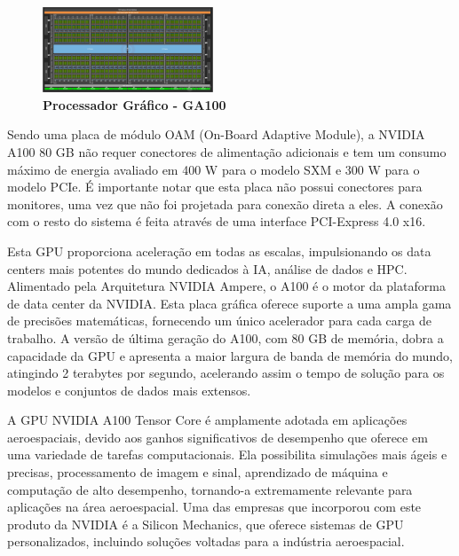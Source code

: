 \documentclass[conference]{IEEEtran}
\begin{document}
\begin{figure}[h]
\centerline{\includegraphics[width = 2.0in]{ga100.jpg}}
\caption{\textbf{Processador Gráfico - GA100}}
\label{figAM9300}
\end{figure}

\par Sendo uma placa de módulo OAM (On-Board Adaptive Module), a NVIDIA A100 80 GB não requer conectores de alimentação adicionais e tem um consumo máximo de energia avaliado em 400 W para o modelo SXM e 300 W para o modelo PCIe. É importante notar que esta placa não possui conectores para monitores, uma vez que não foi projetada para conexão direta a eles. A conexão com o resto do sistema é feita através de uma interface PCI-Express 4.0 x16.

\par Esta GPU proporciona aceleração em todas as escalas, impulsionando os data centers mais potentes do mundo dedicados à IA, análise de dados e HPC.  Alimentado pela Arquitetura NVIDIA Ampere, o A100 é o motor da plataforma de data center da NVIDIA. Esta placa gráfica oferece suporte a uma ampla gama de precisões matemáticas, fornecendo um único acelerador para cada carga de trabalho. A versão de última geração do A100, com 80 GB de memória, dobra a capacidade da GPU e apresenta a maior largura de banda de memória do mundo, atingindo 2 terabytes por segundo, acelerando assim o tempo de solução para os modelos e conjuntos de dados mais extensos.

\par A GPU NVIDIA A100 Tensor Core é amplamente adotada em aplicações aeroespaciais, devido aos ganhos significativos de desempenho que oferece em uma variedade de tarefas computacionais. Ela possibilita simulações mais ágeis e precisas, processamento de imagem e sinal, aprendizado de máquina e computação de alto desempenho, tornando-a extremamente relevante para aplicações na área aeroespacial. Uma das empresas que incorporou com este produto da NVIDIA é a Silicon Mechanics, que oferece sistemas de GPU personalizados, incluindo soluções voltadas para a indústria aeroespacial.
\end{document}
